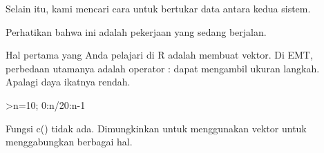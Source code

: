 \documentclass[a4paper,10pt]{article}
\begin{document}
\begin{eulernotebook}
\begin{eulercomment}
\begin{eulercomment}
\begin{eulercomment}
\begin{eulercomment}
\begin{eulercomment}
\begin{eulercomment}
\begin{eulercomment}
\begin{eulercomment}
\begin{eulercomment}
\begin{eulercomment}
\begin{eulercomment}
\begin{eulercomment}
\begin{eulercomment}
\begin{eulercomment}
\begin{eulercomment}
\begin{eulercomment}
\begin{eulercomment}
\begin{eulercomment}
\begin{eulercomment}
Selain itu, kami mencari cara untuk bertukar data antara kedua sistem.
\end{eulercomment}
\begin{eulercomment}
Perhatikan bahwa ini adalah pekerjaan yang sedang berjalan.
\end{eulercomment}
\begin{eulercomment}
Hal pertama yang Anda pelajari di R adalah membuat vektor. Di EMT,
perbedaan utamanya adalah operator : dapat mengambil ukuran langkah.
Apalagi daya ikatnya rendah.
\end{eulercomment}
\begin{eulerprompt}
>n=10; 0:n/20:n-1
\end{eulerprompt}
\begin{euleroutput}
  [0,  0.5,  1,  1.5,  2,  2.5,  3,  3.5,  4,  4.5,  5,  5.5,  6,  6.5,
  7,  7.5,  8,  8.5,  9]
\end{euleroutput}
\begin{eulercomment}
Fungsi c() tidak ada. Dimungkinkan untuk menggunakan vektor untuk
menggabungkan berbagai hal.


\end{eulercomment}
\end{eulercomment}
\end{eulercomment}
\end{eulercomment}
\end{eulercomment}
\end{eulercomment}
\end{eulercomment}
\end{eulercomment}
\end{eulercomment}
\end{eulercomment}
\end{eulercomment}
\end{eulercomment}
\end{eulercomment}
\end{eulercomment}
\end{eulercomment}
\end{eulercomment}
\end{eulercomment}
\end{eulercomment}
\end{eulercomment}
\end{eulernotebook}
\end{document}
